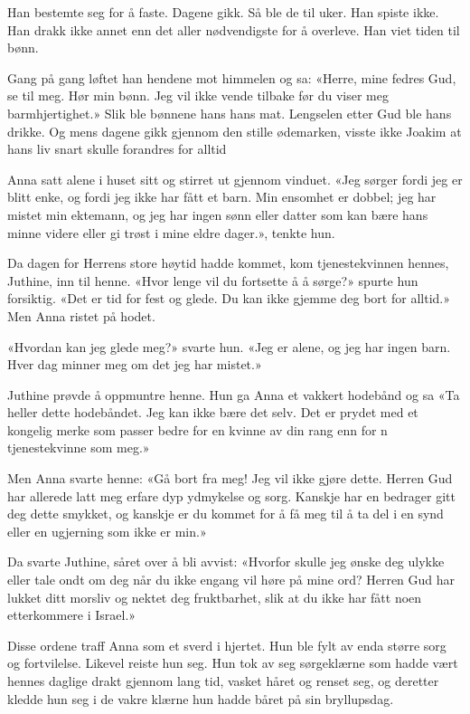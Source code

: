 Han bestemte seg for å faste.
Dagene gikk. Så ble de til uker.
Han spiste ikke. Han drakk ikke annet
enn det aller nødvendigste for å overleve. Han viet tiden til bønn.

Gang på gang løftet han hendene mot himmelen og sa:
«Herre, mine fedres Gud, se til meg. Hør min bønn.
Jeg vil ikke vende tilbake før du viser meg barmhjertighet.»
Slik ble bønnene hans hans mat. Lengselen etter Gud ble hans drikke.
Og mens dagene gikk gjennom den stille ødemarken,
visste ikke Joakim at hans liv snart skulle forandres for alltid





Anna satt alene i huset sitt og stirret ut gjennom vinduet.
«Jeg sørger fordi jeg er blitt enke, og fordi jeg ikke har fått et barn.
Min ensomhet er dobbel; jeg har mistet min ektemann,
og jeg har ingen sønn eller datter som kan bære hans minne
videre eller gi trøst i mine eldre dager.», tenkte hun.

Da dagen  for Herrens store høytid hadde kommet,
kom tjenestekvinnen hennes, Juthine, inn til henne.
 «Hvor lenge vil du fortsette å å sørge?» spurte hun forsiktig.
 «Det er tid for fest og glede. Du kan ikke gjemme deg bort for alltid.»
 Men Anna ristet på hodet.

 «Hvordan kan jeg glede meg?» svarte hun. «Jeg er alene,
  og jeg har ingen barn. Hver dag minner meg om det jeg har mistet.»

 Juthine prøvde å oppmuntre henne. Hun ga Anna et vakkert
 hodebånd og sa   «Ta heller dette hodebåndet. Jeg kan ikke bære det selv.
 Det er prydet med et kongelig merke som passer
 bedre for en kvinne av din rang enn for n tjenestekvinne som meg.»

  Men Anna svarte henne:
    «Gå bort fra meg! Jeg vil ikke gjøre dette. Herren Gud
    har allerede latt meg erfare dyp ydmykelse og sorg.
    Kanskje har en bedrager gitt deg dette smykket,
    og kanskje er du kommet for å få meg til å ta del i en
    synd eller en ugjerning som ikke er min.»

    Da svarte Juthine, såret over å bli avvist:
    «Hvorfor skulle jeg ønske deg ulykke eller
    tale ondt om deg når du ikke engang vil høre på mine ord?
    Herren Gud har lukket ditt morsliv og nektet deg fruktbarhet,
    slik at du ikke har fått noen etterkommere i Israel.»

    Disse ordene traff Anna som et sverd i hjertet.
    Hun ble fylt av enda større sorg og fortvilelse.
    Likevel reiste hun seg. Hun tok av seg sørgeklærne
    som hadde vært hennes daglige drakt gjennom lang tid,
    vasket håret og renset seg, og deretter kledde hun seg i
    de vakre klærne hun hadde båret på sin bryllupsdag.

